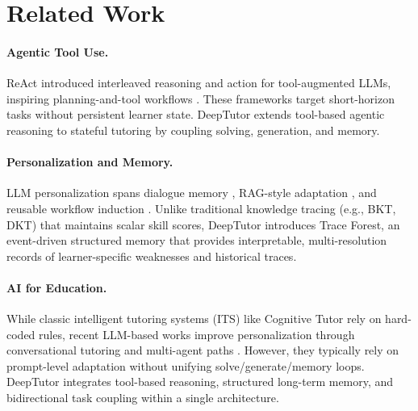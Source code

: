 \section{Related Work}
\label{sec:related}

\paragraph{Agentic Tool Use.}
ReAct \citep{yao2023reactsynergizingreasoningacting} introduced interleaved reasoning and action for tool-augmented LLMs, inspiring planning-and-tool workflows \citep{zhao2025llmbasedagenticreasoningframeworks,wu-etal-2025-agentic,li2025intheflowagenticoptimizationeffective}. These frameworks target short-horizon tasks without persistent learner state. DeepTutor extends tool-based agentic reasoning to stateful tutoring by coupling solving, generation, and memory.

\paragraph{Personalization and Memory.}
LLM personalization spans dialogue memory \citep{tan-etal-2025-prospect,li-etal-2025-hello,cho-etal-2022-personalized}, RAG-style adaptation \citep{li2025surveypersonalizationragagent,guo2025raganythingallinoneragframework}, and reusable workflow induction \citep{wang2024agentworkflowmemory}. Unlike traditional knowledge tracing (e.g., BKT, DKT) that maintains scalar skill scores, DeepTutor introduces Trace Forest, an event-driven structured memory that provides interpretable, multi-resolution records of learner-specific weaknesses and historical traces.

\paragraph{AI for Education.}
While classic intelligent tutoring systems (ITS) like Cognitive Tutor rely on hard-coded rules, recent LLM-based works improve personalization through conversational tutoring \citep{park2024empoweringpersonalizedlearning} and multi-agent paths \citep{wang2025llmpoweredmultiagentframeworkgoaloriented}. However, they typically rely on prompt-level adaptation without unifying solve/generate/memory loops. DeepTutor integrates tool-based reasoning, structured long-term memory, and bidirectional task coupling within a single architecture.
